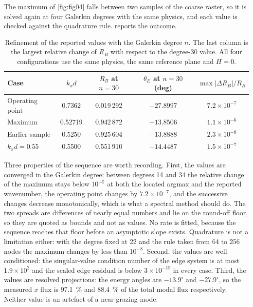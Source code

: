 The maximum of \cref{fig:fig04} falls between two samples of the coarse raster,
so it is solved again at four Galerkin degrees with the same physics, and each
value is checked against the quadrature rule.   reports the
outcome.

\begin{table}[t]
\centering
\caption{Refinement of the reported values with the Galerkin degree $n$.  The
last column is the largest relative change of $R_B$ with respect to the
degree-30 value.  All four configurations use the same physics, the same
reference plane and $H=0$.}
\label{tab:refinement}
\begin{tabular}{@{}lcccc@{}}
\toprule
Case & $k_xd$ & $R_B$ at $n=30$ & $\theta_E$ at $n=30$ (deg) & $\max|\Delta R_B|/R_B$ \\
\midrule
Operating point   & 0.7362 & 0.019\,292 & $-27.8997$ & $7.2\times10^{-7}$ \\
Maximum & 0.52719 & 0.942\,872 & $-13.8506$ & $1.1\times10^{-6}$ \\
Earlier sample    & 0.5250 & 0.925\,604 & $-13.8888$ & $2.3\times10^{-8}$ \\
$k_xd=0.55$       & 0.5500 & 0.551\,910 & $-14.4487$ & $1.5\times10^{-7}$ \\
\bottomrule
\end{tabular}
\end{table}

Three properties of the sequence are worth recording.  First, the values are
converged in the Galerkin degree: between degrees 14 and 34 the relative
change of the maximum stays below $10^{-5}$ at both the located argmax and the
reported wavenumber, the operating point changes by $7.2\times10^{-7}$, and the
successive changes decrease monotonically, which is what a spectral method
should do.  The two spreads are differences of nearly equal numbers and lie on
the round-off floor, so they are quoted as bounds and not as values.  No rate is
fitted, because the sequence reaches that floor before an asymptotic slope
exists.  Quadrature is not a limitation either: with the degree fixed at 22 and
the rule taken from 64 to 256 nodes the maximum changes by less than $10^{-8}$.  Second, the values
are well conditioned: the singular-value condition number of the edge system is
at most $1.9\times10^{2}$ and the scaled edge residual is below
$3\times10^{-15}$ in every case.  Third, the values are resolved projections:
the energy angles are $-13.9^{\circ}$ and $-27.9^{\circ}$, so the measured $x$
flux is \SI{97.1}{\percent} and \SI{88.4}{\percent} of the total modal flux
respectively.  Neither value is an artefact of a near-grazing mode.

